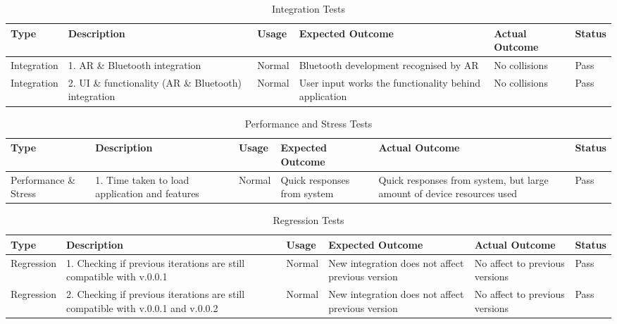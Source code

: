 \begin{sidewaystable}
\begin{table}[H]
\begin{tabular}{|p{2cm}|p{5cm}|l|p{5cm}|p{5cm}|l|}
\toprule
\textbf{Type}         & \textbf{Description}                                 & \textbf{Usage} & \textbf{Expected Outcome}                             & \textbf{Actual Outcome} & \textbf{Status} \\ \midrule
Integration & 1. AR \& Bluetooth integration                       & Normal         & Bluetooth development recognised by AR                & No collisions           & Pass            \\ \hline
Integration & 2. UI \& functionality (AR \& Bluetooth) integration & Normal         & User input works the functionality behind application & No collisions           & Pass            \\
\bottomrule
\end{tabular}
\caption{Integration Tests}
\label{table:integrationtests}
\end{table}

\begin{table}[H]
\begin{tabular}{|p{2cm}|p{5cm}|l|p{5cm}|p{5cm}|l|}
\toprule
\textbf{Type}         & \textbf{Description}                           & \textbf{Usage} & \textbf{Expected Outcome}   & \textbf{Actual Outcome}                                                & \textbf{Status} \\ \hline
Performance \& Stress & 1. Time taken to load application and features & Normal         & Quick responses from system & Quick responses from system, but large amount of device resources used & Pass            \\
\bottomrule
\end{tabular}
\caption{Performance and Stress Tests}
\label{table:stresstests}
\end{table}

\begin{table}[H]
\begin{tabular}{|p{2cm}|p{5cm}|l|p{5cm}|p{5cm}|l|}
\toprule
\textbf{Type} & \textbf{Description}                                                             & \textbf{Usage} & \textbf{Expected Outcome}                        & \textbf{Actual Outcome}        & \textbf{Status} \\ \hline
Regression    & 1. Checking if previous iterations are still compatible with v.0.0.1             & Normal         & New integration does not affect previous version & No affect to previous versions & Pass            \\ \hline
Regression    & 2. Checking if previous iterations are still compatible with v.0.0.1 and v.0.0.2 & Normal         & New integration does not affect previous version & No affect to previous versions & Pass            \\
\bottomrule
\end{tabular}
\caption{Regression Tests}
\label{table:regressiontests}
\end{table}
\end{sidewaystable}

